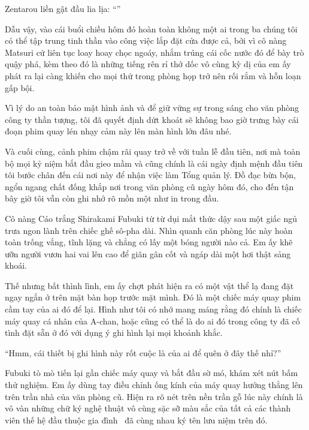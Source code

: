 \documentclass[../main.tex]{subfiles}
\begin{document}
Zentarou liền gật đầu lia lịa: ``''

Dẫu vậy, vào cái buổi chiều hôm đó hoàn toàn không một ai trong ba chúng tôi có thể tập trung tinh thần vào công việc lắp đặt cửa được cả, bởi vì cô nàng Matsuri cứ liên tục loay hoay chọc ngoáy, nhắm trúng cái cốc nước đó để bày trò quậy phá, kèm theo đó là những tiếng rên rỉ thở dốc vô cùng kỳ dị của em ấy phát ra lại càng khiến cho mọi thứ trong phòng họp trở nên rối rắm và hỗn loạn gấp bội.

Vì lý do an toàn bảo mật hình ảnh và để giữ vững sự trong sáng cho văn phòng công ty thần tượng, tôi đã quyết định dứt khoát sẽ không bao giờ trưng bày cái đoạn phim quay lén nhạy cảm này lên màn hình lớn đâu nhé.

\il


Và cuối cùng, cảnh phim chậm rãi quay trở về với tuần lễ đầu tiên, nơi mà toàn bộ mọi kỷ niệm bắt đầu gieo mầm và cũng chính là cái ngày định mệnh đầu tiên tôi bước chân đến cái nơi này để nhận việc làm Tổng quản lý. Đồ đạc bừa bộn, ngổn ngang chất đống khắp nơi trong văn phòng cũ ngày hôm đó, cho đến tận bây giờ tôi vẫn còn ghi nhớ rõ mồn một như in trong đầu.

Cô nàng Cáo trắng Shirakami Fubuki từ từ dụi mắt thức dậy sau một giấc ngủ trưa ngon lành trên chiếc ghế sô-pha dài. Nhìn quanh căn phòng lúc này hoàn toàn trống vắng, tĩnh lặng và chẳng có lấy một bóng người nào cả. Em ấy khẽ ưỡn người vươn hai vai lên cao để giãn gân cốt và ngáp dài một hơi thật sảng khoái.


Thế nhưng bất thình lình, em ấy chợt phát hiện ra có một vật thể lạ đang đặt ngay ngắn ở trên mặt bàn họp trước mặt mình. Đó là một chiếc máy quay phim cầm tay của ai đó để lại. Hình như tôi có nhớ mang máng rằng đó chính là chiếc máy quay cá nhân của A-chan, hoặc cũng có thể là do ai đó trong công ty đã cố tình đặt sẵn ở đó với dụng ý ghi hình lại mọi khoảnh khắc.

``Hmm, cái thiết bị ghi hình này rốt cuộc là của ai để quên ở đây thế nhỉ?''

Fubuki tò mò tiến lại gần chiếc máy quay và bắt đầu sờ mó, khám xét nút bấm thử nghiệm. Em ấy dùng tay điều chỉnh ống kính của máy quay hướng thẳng lên trên trần nhà của văn phòng cũ. Hiện ra rõ nét trên nền trần gỗ lúc này chính là vô vàn những chữ ký nghệ thuật vô cùng sặc sỡ màu sắc của tất cả các thành viên thế hệ đầu thuộc gia đình \hll\ đã cùng nhau ký tên lưu niệm trên đó.
\end{document}
